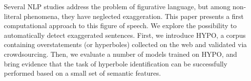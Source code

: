 Several NLP studies address the problem of figurative language, but among non-literal phenomena, they have neglected exaggeration. This paper presents a first computational approach to this figure of speech. We explore the possibility to automatically detect exaggerated sentences. First, we introduce HYPO, a corpus containing overstatements (or hyperboles) collected on the web and validated via crowdsourcing. Then, we evaluate a number of models trained on HYPO, and bring evidence that the task of hyperbole identification can be successfully performed based on a small set of semantic features.
